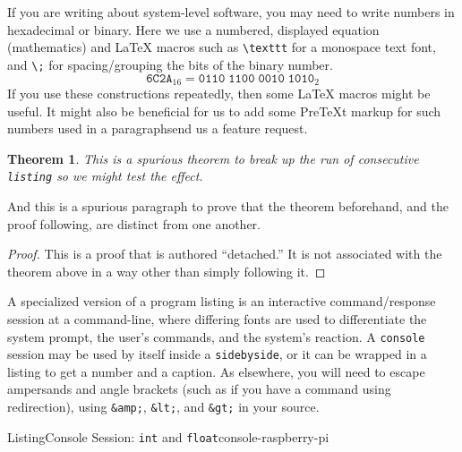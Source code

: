 \documentclass{sn-jnl}
\theoremstyle{thmstyleone}%
\newtheorem{theorem}{Theorem}[section]
\theoremstyle{thmstyletwo}%
\theoremstyle{thmstylethree}%
\newcommand{\mono}[1]{\texttt{#1}}
\numberwithin{equation}{section}
\newcommand{\consoleinput}[1]{\textbf{#1}}
\begin{document}
%
If you are writing about system-level software, you may need to write numbers in hexadecimal or binary.  Here we use a numbered, displayed equation (mathematics) and \LaTeX{} macros such as \mono{\textbackslash{}texttt} for a monospace text font, and \mono{\textbackslash{};} for spacing\slash{}grouping the bits of the binary number.%
\begin{equation}
\texttt{6C2A}_{16} = \texttt{0110}\;\texttt{1100}\;\texttt{0010}\;\texttt{1010}_{2}\label{section-programs-23-4}
\end{equation}
If you use these constructions repeatedly, then some \LaTeX{} macros might be useful.  It might also be beneficial for us to add some PreTeXt markup for such numbers used in a paragraph\textemdash{}send us a feature request.%
\begin{theorem}\label{theorem-detached}%
%
This is a spurious theorem to break up the run of consecutive \mono{listing} so we might test the effect.%
\end{theorem}
And this is a spurious paragraph to prove that the theorem beforehand, and the proof following, are distinct from one another.%
\begin{proof}\label{section-programs-26}%
This is a proof that is authored ``detached.''  It is not associated with the theorem above in a way other than simply following it.%
\end{proof}
A specialized version of a program listing is an interactive command\slash{}response session at a command-line, where differing fonts are used to differentiate the system prompt, the user's commands, and the system's reaction.  A   \mono{console} session may be used by itself inside a \mono{sidebyside}, or it can be wrapped in a listing to get a number and a caption.  As elsewhere, you will need to escape ampersands and angle brackets (such as if you have a command using redirection), using \mono{\&amp;}, \mono{\&lt;}, and \mono{\&gt;} in your source.%
\begin{listingptx}{Listing}{Console Session: \mono{int} and \mono{float}}{console-raspberry-pi}{}%
\tcblower
\end{listingptx}%
\end{document}
